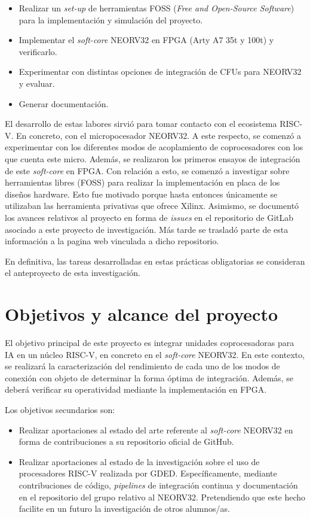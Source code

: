 \begin{itemize}
    \item Realizar un \textit{set-up} de herramientas FOSS (\textit{Free and Open-Source Software}) para la implementación y simulación del proyecto.
    \item Implementar el \textit{soft-core} NEORV32 en FPGA (Arty A7 35t y 100t) y verificarlo.
    \item Experimentar con distintas opciones de integración de CFUs para NEORV32 y evaluar.
    \item Generar documentación. 
\end{itemize} 

El desarrollo de estas labores sirvió para tomar contacto con el ecosistema RISC-V. 
En concreto, con el micropocesador NEORV32.
A este respecto, se comenzó a experimentar con los diferentes modos de acoplamiento de coprocesadores con los que cuenta este micro.
Además, se realizaron los primeros ensayos de integración de este \textit{soft-core} en FPGA.
Con relación a esto, se comenzó a investigar sobre herramientas libres (FOSS) para realizar la implementación en placa de los diseños hardware.
Esto fue motivado porque hasta entonces únicamente se utilizaban las herramienta privativas que ofrece Xilinx.
Asimismo, se documentó los avances relativos al proyecto en forma de \textit{issues} en el repositorio de GitLab asociado a este proyecto de investigación.
Más tarde se trasladó parte de esta información a la pagina web vinculada a dicho repositorio.

En definitiva, las tareas desarrolladas en estas prácticas obligatorias se consideran el anteproyecto de esta investigación.

\section{Objetivos y alcance del proyecto}


El objetivo principal de este proyecto es integrar unidades coprocesadoras para IA en un núcleo RISC-V, en concreto en el \textit{soft-core} NEORV32. 
En este contexto, se realizará la caracterización del rendimiento de cada uno de los modos de conexión con objeto de determinar la forma óptima de integración.
Además, se deberá verificar su operatividad mediante la implementación en FPGA.

Los objetivos secundarios son:
\begin{itemize}
    \item Realizar aportaciones al estado del arte referente al \textit{soft-core} NEORV32 en forma de contribuciones a su repositorio oficial de GitHub.
    \item Realizar aportaciones al estado de la investigación sobre el uso de procesadores RISC-V realizada por GDED.
Específicamente, mediante contribuciones de código, \textit{pipelines} de integración continua y documentación en el repositorio del grupo relativo al NEORV32. 
Pretendiendo que este hecho facilite en un futuro la investigación de  otros alumnos/as.
\end{itemize} 

